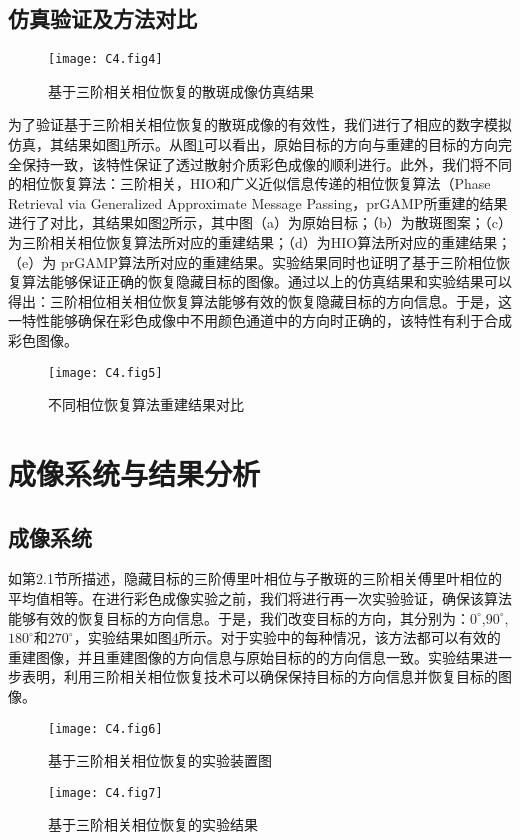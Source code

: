 \subsection{仿真验证及方法对比}

\begin{figure}[htp]
	\centering
	\texttt{[image: C4.fig4]}
	\caption{基于三阶相关相位恢复的散斑成像仿真结果}
	\label{fig:4.4}
\end{figure}

为了验证基于三阶相关相位恢复的散斑成像的有效性，我们进行了相应的数字模拟仿真，其结果如图\ref{fig:4.4}所示。从图\ref{fig:4.4}可以看出，原始目标的方向与重建的目标的方向完全保持一致，该特性保证了透过散射介质彩色成像的顺利进行。此外，我们将不同的相位恢复算法：三阶相关，HIO和广义近似信息传递的相位恢复算法（Phase Retrieval via Generalized Approximate Message Passing，prGAMP所重建的结果进行了对比，其结果如图\ref{fig:4.5}所示，其中图（a）为原始目标；（b）为散斑图案；（c）为三阶相关相位恢复算法所对应的重建结果；（d）为HIO算法所对应的重建结果；（e）为 prGAMP算法所对应的重建结果。实验结果同时也证明了基于三阶相位恢复算法能够保证正确的恢复隐藏目标的图像。通过以上的仿真结果和实验结果可以得出：三阶相位相关相位恢复算法能够有效的恢复隐藏目标的方向信息。于是，这一特性能够确保在彩色成像中不用颜色通道中的方向时正确的，该特性有利于合成彩色图像。

\begin{figure}[htp]
	\centering
	\texttt{[image: C4.fig5]}
	\caption{不同相位恢复算法重建结果对比}
	\label{fig:4.5}
\end{figure}

\section{成像系统与结果分析}
\subsection{成像系统}

如第2.1节所描述，隐藏目标的三阶傅里叶相位与子散斑的三阶相关傅里叶相位的平均值相等。在进行彩色成像实验之前，我们将进行再一次实验验证，确保该算法能够有效的恢复目标的方向信息。于是，我们改变目标的方向，其分别为：$0^{\circ}$,$90^{\circ}$,$180^{\circ}$和$270^{\circ}$，实验结果如图\ref{fig:4.7}所示。对于实验中的每种情况，该方法都可以有效的重建图像，并且重建图像的方向信息与原始目标的的方向信息一致。实验结果进一步表明，利用三阶相关相位恢复技术可以确保保持目标的方向信息并恢复目标的图像。

\begin{figure}[htp]
	\centering
	\texttt{[image: C4.fig6]}
	\caption{基于三阶相关相位恢复的实验装置图}
	\label{fig:4.6}
\end{figure}
\begin{figure}[htp]
	\centering
	\texttt{[image: C4.fig7]}
	\caption{基于三阶相关相位恢复的实验结果}
	\label{fig:4.7}
\end{figure}

